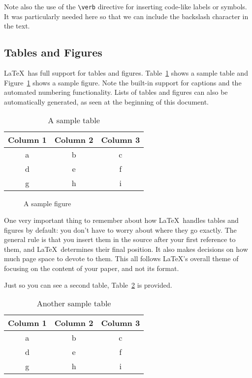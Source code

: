 \documentclass{article}
\begin{document}
Note also the use of the \verb!\verb! directive for inserting code-like labels or symbols.  It was particularly needed here so that we can include the backslash character in the text.
\subsection{Tables and Figures}

\LaTeX\ has full support for tables and figures.  Table~\ref{table-sample} shows a sample table and Figure~\ref{figure-sample} shows a sample figure.  Note the built-in support for captions and the automated numbering functionality.  Lists of tables and figures can also be automatically generated, as seen at the beginning of this document.
\begin{table}
\centering
\begin{tabular}{|c|c|c|}\hline
Column 1 & Column 2 & Column 3 \\\hline\hline
a & b & c \\
d & e & f \\
g & h & i \\\hline
\end{tabular}

\caption{A sample table}
\label{table-sample}
\end{table}

\begin{figure}
\centering


\caption{A sample figure}
\label{figure-sample}
\end{figure}

One very important thing to remember about how \LaTeX\ handles tables and figures by default: you don't have to worry about where they go exactly.  The general rule is that you insert them in the source after your first reference to them, and \LaTeX\ determines their final position.  It also makes decisions on how much page space to devote to them.  This all follows \LaTeX's overall theme of focusing on the content of your paper, and not its format.

Just so you can see a second table, Table~\ref{table-sample2} is provided.

\begin{table}
\centering
\begin{tabular}{|c|c|c|}\hline
Column 1 & Column 2 & Column 3 \\\hline\hline
a & b & c \\
d & e & f \\
g & h & i \\\hline
\end{tabular}

\caption{Another sample table}
\label{table-sample2}
\end{table}
\end{document}
